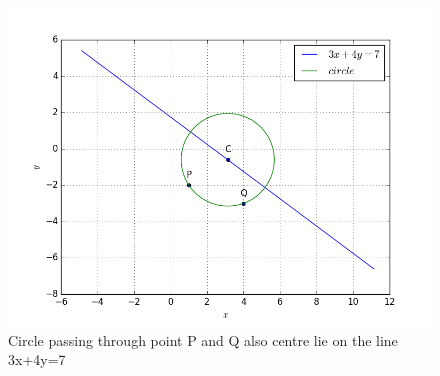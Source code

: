 \documentclass[journal,12pt,twocolumn]{IEEEtran}
\begin{document}
\begin{figure}[!ht]
\centering
\includegraphics[width=\columnwidth]{figure.png}
\caption{Circle passing through point P and Q also centre lie on the line 3x+4y=7}
\label{Fig}
\end{figure}
\end{document}
